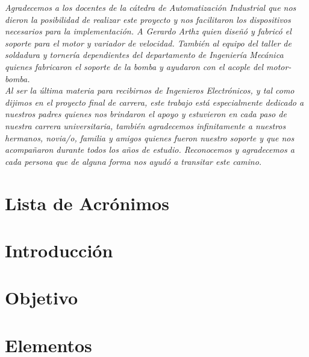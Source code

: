 \documentclass[12pt,a4paper]{article}
\begin{document}
	\begin{flushleft}
		\textit{	Agradecemos a los docentes de la cátedra de Automatización Industrial que nos dieron la posibilidad de realizar este proyecto y nos facilitaron los dispositivos necesarios para la implementación. A Gerardo Arthz quien diseñó y fabricó el soporte para el motor y variador de velocidad. También al equipo del taller de soldadura y tornería dependientes del departamento de Ingeniería Mecánica quienes fabricaron el soporte de la bomba y ayudaron con el acople del motor- bomba.}\\
	\vspace{3cm}
	\textit{	Al ser la última materia para recibirnos de Ingenieros Electrónicos, y tal como dijimos en el proyecto final de carrera, este trabajo está especialmente dedicado a nuestros padres quienes nos brindaron el apoyo y estuvieron en cada paso de nuestra carrera universitaria, también agradecemos infinitamente a nuestros hermanos, novia/o, familia y amigos quienes fueron nuestro soporte y que nos acompañaron durante todos los años de estudio. Reconocemos y agradecemos a cada persona que de alguna forma nos ayudó a transitar este camino.}
	\end{flushleft}



\newpage

\tableofcontents
\newpage

\listoffigures
\newpage

\listoftables
\newpage
\section*{Lista de Acrónimos}

\sloppy %

\section{Introducción}


\section{Objetivo}






\section{Elementos}

\end{document}

